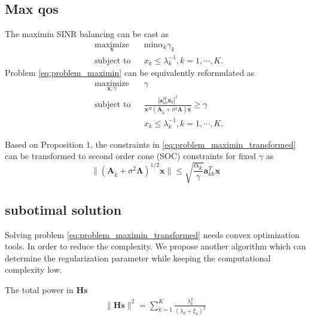 \documentclass[12pt,journal,draftclsnofoot,onecolumn]{IEEEtran}
\begin{document}
\subsection{Max qos} 
The maximin SINR balancing can be cast as
\begin{equation}
\begin{aligned} \label{eq:problem_maximin}
& \underset{\mathbf{x}}{\text{maximize}}
& & \text{min} \alpha_k\gamma_k \\
& \text{subject to}
&& x_k \leq \lambda_k^{-1}, k=1, \cdots, K.
\end{aligned}
\end{equation}
Problem \eqref{eq:problem_maximin} can be equivalently reformulated as
\begin{equation}
\begin{aligned} \label{eq:problem_maximin_transformed}
& \underset{\mathbf{x},\gamma}{\text{maximize}}
& & \gamma \\
& \text{subject to}
& &  \frac{|\mathbf{a}_{kk}^H\mathbf{x}_k|^2}{\mathbf{x}^H \left(\mathbf{A}_{\tilde{k}} + \sigma^2\mathbf{\Lambda}\right)\mathbf{x}} \geq \gamma\\
&&& x_k \leq \lambda_k^{-1}, k=1, \cdots, K.
\end{aligned}
\end{equation}

Based on Proposition 1, the constraints in \eqref{eq:problem_maximin_transformed} can be transformed to second order cone (SOC) constraints for fixed $\gamma$ as
\begin{equation}
\|\left(\mathbf{A}_{\tilde{k}} + \sigma^2\mathbf{\Lambda}\right)^{1/2}\mathbf{x}\| \leq \sqrt{\frac{\alpha_k}{\gamma}}\mathbf{a}_{kk}^T\mathbf{x}
\end{equation}


\subsection{subotimal solution}
Solving problem \eqref{eq:problem_maximin_transformed} needs convex optimization tools. In order to reduce the complexity. We propose another algorithm  which can determine the regularization parameter while keeping the computational complexity low.

The total power in $\mathbf{H}\mathbf{s}$ 
\begin{eqnarray}
\|\mathbf{H}\mathbf{s}\|^2 = \sum_{k = 1}^{K}\frac{\lambda_k^2}{(\lambda_k + \xi_k)^2}
\end{eqnarray}
\end{document}
